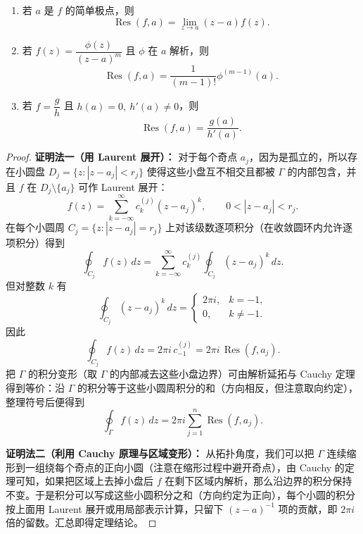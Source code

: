 \documentclass[lang=cn,10pt]{elegantbook}
\begin{document}
	\begin{theorem}[留数的常用计算公式]
		\begin{enumerate}[leftmargin=*,itemsep=4pt]
			\item 若 \(a\) 是 \(f\) 的简单极点，则
			\[
			\operatorname{Res}(f,a)=\lim_{z\to a}(z-a)f(z).
			\]
			\item 若 \(f(z)=\dfrac{\phi(z)}{(z-a)^m}\) 且 \(\phi\) 在 \(a\) 解析，则
			\[
			\operatorname{Res}(f,a)=\frac{1}{(m-1)!}\phi^{(m-1)}(a).
			\]
			\item 若 \(f=\dfrac{g}{h}\) 且 \(h(a)=0,\ h'(a)\neq0\)，则
			\[
			\operatorname{Res}(f,a)=\frac{g(a)}{h'(a)}.
			\]
		\end{enumerate}
	\end{theorem}
	\begin{proof}
		\noindent\textbf{证明法一（用 Laurent 展开）：}
		对于每个奇点 \(a_j\)，因为是孤立的，所以存在小圆盘 \(D_j=\{z:|z-a_j|<r_j\}\) 使得这些小盘互不相交且都被 \(\Gamma\) 的内部包含，并且 \(f\) 在 \(D_j\setminus\{a_j\}\) 可作 Laurent 展开：
		\[
		f(z)=\sum_{k=-\infty}^{\infty} c_{k}^{(j)}(z-a_j)^k,\qquad 0<|z-a_j|<r_j.
		\]
		在每个小圆周 \(C_j=\{z:|z-a_j|=r_j\}\) 上对该级数逐项积分（在收敛圆环内允许逐项积分）得到
		\[
		\oint_{C_j} f(z)\,dz
		= \sum_{k=-\infty}^{\infty} c_k^{(j)} \oint_{C_j} (z-a_j)^k\,dz.
		\]
		但对整数 \(k\) 有
		\[
		\oint_{C_j} (z-a_j)^k\,dz =
		\begin{cases}
			2\pi i, & k=-1,\\
			0, & k\ne -1.
		\end{cases}
		\]
		因此
		\[
		\oint_{C_j} f(z)\,dz = 2\pi i\, c_{-1}^{(j)} = 2\pi i\,\operatorname{Res}(f,a_j).
		\]
		把 \(\Gamma\) 的积分变形（取 \(\Gamma\) 的内部减去这些小盘边界）可由解析延拓与 Cauchy 定理得到等价：沿 \(\Gamma\) 的积分等于这些小圆周积分的和（方向相反，但注意取向约定），整理符号后便得到
		\[
		\oint_{\Gamma} f(z)\,dz = 2\pi i\sum_{j=1}^n \operatorname{Res}(f,a_j).
		\]
		
		\medskip
		\noindent\textbf{证明法二（利用 Cauchy 原理与区域变形）：}
		从拓扑角度，我们可以把 \(\Gamma\) 连续缩形到一组绕每个奇点的正向小圆（注意在缩形过程中避开奇点），由 Cauchy 的定理可知，如果把区域上去掉小盘后 \(f\) 在剩下区域内解析，那么沿边界的积分保持不变。于是积分可以写成这些小圆积分之和（方向约定为正向），每个小圆的积分按上面用 Laurent 展开或用局部表示计算，只留下 \((z-a)^{-1}\) 项的贡献，即 \(2\pi i\) 倍的留数。汇总即得定理结论。
	\end{proof}
	
\end{document}

